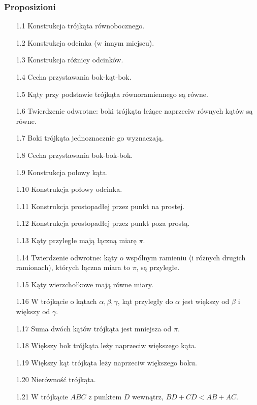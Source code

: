 \subsubsection{Proposizioni} %
\begin{enumerate}
    \item [1.1] Konstrukcja trójkąta równobocznego. %
    \item [1.2] Konstrukcja odcinka (w innym miejscu). %
    \item [1.3] Konstrukcja różnicy odcinków. %
    \item [1.4] Cecha przystawania bok-kąt-bok. %
    \item [1.5] Kąty przy podstawie trójkąta równoramiennego są równe. %
    \item [1.6] Twierdzenie odwrotne: boki trójkąta leżące naprzeciw równych kątów są równe. %
    \item [1.7] Boki trójkąta jednoznacznie go wyznaczają. %
    \item [1.8] Cecha przystawania bok-bok-bok. %
    \item [1.9] Konstrukcja połowy kąta. %
    \item [1.10] Konstrukcja połowy odcinka. %
    \item [1.11] Konstrukcja prostopadłej przez punkt na prostej. %
    \item [1.12] Konstrukcja prostopadłej przez punkt poza prostą. %
    \item [1.13] Kąty przyległe mają łączną miarę $\pi$. %
    \item [1.14] Twierdzenie odwrotne: kąty o wspólnym ramieniu (i różnych drugich ramionach), których łączna miara to $\pi$, są przyległe. %
    \item [1.15] Kąty wierzchołkowe mają równe miary. %
    \item [1.16] W trójkącie o kątach $\alpha, \beta, \gamma$, kąt przyległy do $\alpha$ jest większy od $\beta$ i większy od $\gamma$. %
    \item [1.17] Suma dwóch kątów trójkąta jest mniejsza od $\pi$. %
    \item [1.18] Większy bok trójkąta leży naprzeciw większego kąta. %
    \item [1.19] Większy kąt trójkąta leży naprzeciw większego boku. %
    \item [1.20] Nierówność trójkąta. %
    \item [1.21] W trójkącie $ABC$ z punktem $D$ wewnątrz, $BD + CD < AB + AC$. %

\end{enumerate}
